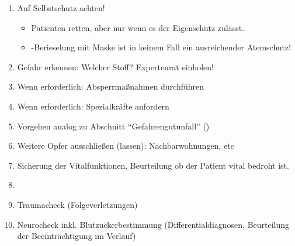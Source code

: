 \label{m:am-reizgase}
\begin{enumerate}
  \item Auf Selbstschutz achten!
  \begin{itemize}
    \item Patienten retten, aber nur wenn es der
    Eigenschutz zulässt.
    \item {}-Berieselung mit Maske ist in keinem Fall
    ein ausreichender Atemschutz!
  \end{itemize}
  \item Gefahr erkennen: Welcher Stoff? Expertenrat einholen!
  \item Wenn erforderlich: Absperrmaßnahmen durchführen
  \item Wenn erforderlich:  Spezialkräfte anfordern
  \item Vorgehen analog zu Abschnitt \enquote{Gefahrengutunfall}
  ()
  \item Weitere Opfer ausschließen (lassen):
  Nachbarwohnungen, etc
  \item Sicherung der Vitalfunktionen, Beurteilung ob der
  Patient vital bedroht ist.
  \item \TxBeiVit 
  \item Traumacheck (Folgeverletzungen)
  \item Neurocheck inkl. Blutzuckerbestimmung
  (Differentialdiagnosen, Beurteilung der Beeinträchtigung im Verlauf)
\end{enumerate}